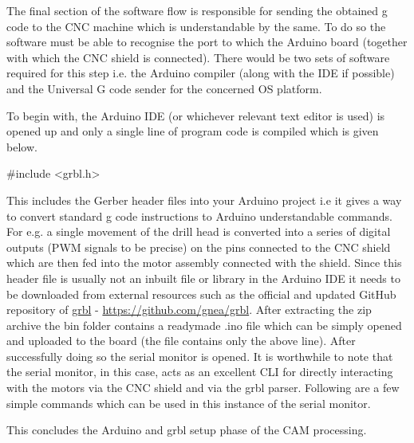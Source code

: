 The final section of the software flow is responsible for sending the obtained g code to the CNC machine which is understandable by the same. To do so the software must be able to recognise the port to which the Arduino board (together with which the CNC shield is connected). There would be two sets of software required for this step i.e. the Arduino compiler (along with the IDE if possible) and the Universal G code sender for the concerned OS platform. \par

To begin with, the Arduino IDE (or whichever relevant text editor is used) is opened up and only a single line of program code is compiled which is given below.

 {\selectfont \#include <grbl.h>}

This includes the Gerber header files into your Arduino project i.e it gives a way to convert standard g code instructions to Arduino understandable commands. For e.g. a single movement of the drill head is converted into a series of digital outputs (PWM signals to be precise) on the pins connected to the CNC shield which are then fed into the motor assembly connected with the shield. Since this header file is usually not an inbuilt file or library in the Arduino IDE it needs to be downloaded from external resources such as the official and updated GitHub repository of \href{https://github.com/gnea/grbl}{grbl} - \url{https://github.com/gnea/grbl}. After extracting the zip archive the bin folder contains a readymade .ino file which can be simply opened and uploaded to the board (the file contains only the above line). After successfully doing so the serial monitor is opened. It is worthwhile to note that the serial monitor, in this case, acts as an excellent CLI for directly interacting with the motors via the CNC shield and via the grbl parser. Following are a few simple commands which can be used in this instance of the serial monitor. \par


This concludes the Arduino and grbl setup phase of the CAM processing.

